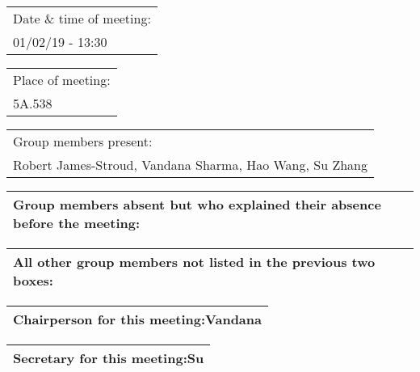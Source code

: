 \documentclass{article}
\begin{document}
\begin{table}[H]
	\centering
	\begin{tabular}{| p{12cm}  |}
	\hline
	Date \& time of meeting: \\ 
	01/02/19 - 13:30 \\ \hline
\end{tabular}
\end{table}

\begin{table}[H]
	\centering
	\begin{tabular}{| p{12cm}  |}
	\hline
	Place of meeting: \\ 
	5A.538 \\ \hline
\end{tabular}
\end{table}

\begin{table}[H]
	\centering
	\begin{tabular}{| p{12cm}  |}
	\hline
	Group members present: \\ 
	Robert James-Stroud, Vandana Sharma, Hao Wang, Su Zhang \\ \hline
\end{tabular}
\end{table}

\begin{table}[H]
	\centering
	\begin{tabular}{| p{12cm}  |}
	\hline
	Group members absent but who explained their absence before the meeting: \\ \hline
\end{tabular}
\end{table}

\begin{table}[H]
	\centering
	\begin{tabular}{| p{12cm}  |}
	\hline
	All other group members not listed in the previous two boxes: \\ \hline
\end{tabular}
\end{table}

\begin{table}[H]
	\centering
	\begin{tabular}{| p{12cm}  |}
	\hline
	Chairperson for this meeting:Vandana \\ \hline
\end{tabular}
\end{table}

\begin{table}[H]
	\centering
	\begin{tabular}{| p{12cm}  |}
	\hline
	Secretary for this meeting:Su \\ \hline
\end{tabular}
\end{table}
\end{document}
